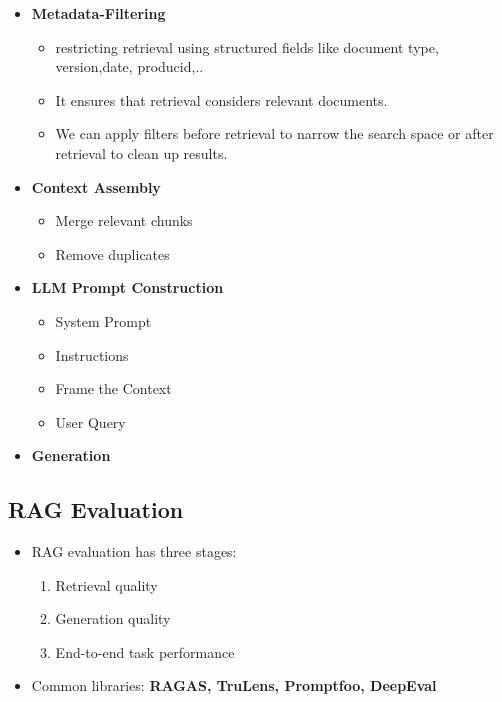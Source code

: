 \documentclass[10pt,a4paper]{article}
\begin{document}
\begin{itemize}
\item
  \textbf{Metadata-Filtering}

  \begin{itemize}
  \item
    restricting retrieval using structured fields like document type, version,date, producid,..
  \item
    It ensures that retrieval considers relevant documents.
  \item
    We can apply filters before retrieval to narrow the search space or after retrieval to clean up results.
  \end{itemize}
\item
  \textbf{Context Assembly}

  \begin{itemize}
  \item
    Merge relevant chunks
  \item
    Remove duplicates
  \end{itemize}
\item
  \textbf{LLM Prompt Construction}

  \begin{itemize}
  
  \item
    System Prompt
  \item
    Instructions
  \item
    Frame the Context
  \item
    User Query
  \end{itemize}
\item
  \textbf{Generation}
\end{itemize}

\subsection{RAG Evaluation}\label{rag-evaluation}

\begin{itemize}
\item RAG evaluation has three stages:
  \begin{enumerate}
    \item Retrieval quality
    \item Generation quality
    \item End-to-end task performance
  \end{enumerate}

\item Common libraries: \textbf{RAGAS, TruLens, Promptfoo, DeepEval}
\end{itemize}
\end{document}
